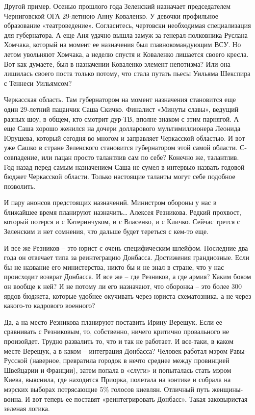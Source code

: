 Другой пример. Осенью прошлого года Зеленский назначает председателем
Черниговской ОГА 29-летнюю Анну Коваленко. У девочки профильное образование
«театроведение». Согласитесь, чертовски необходимая специализация для
губернатора. А еще Аня удачно вышла замуж за генерал-полковника Руслана
Хомчака, который на момент ее назначения был главнокомандующим ВСУ. Но летом
увольняют Хомчака, а неделю спустя и Коваленко лишается своего кресла. Вот как
думаете, был в назначении Коваленко элемент непотизма? Или она лишилась своего
поста только потому, что стала путать пьесы Уильяма Шекспира с Теннеси
Уильямсом?

Черкасская область. Там губернатором на момент назначения становится еще один
29-летний пацанчик Саша Скичко. Финалист «Минуты славы», ведущий разных шоу, в
общем, кто смотрит дур-ТВ, вполне знаком с этим парнягой. А еще Саша хорошо
женился на дочери долларового мультимиллионера Леонида Юрушева, который сегодня
во многом и заправляет Черкасской областью. И вот уже Сашко в стране Зеленского
становится губернатором этой самой области. С-совпадение, или пацан просто
талантлив сам по себе? Конечно же, талантлив. Год назад перед самым назначением
Саша не сумел в интервью назвать годовой бюджет Черкасской области. Только
настоящие таланты могут себе подобное позволить.

И пару анонсов предстоящих назначений. Министром обороны у нас в ближайшее
время планируют назначить… Алексея Резникова. Редкий прохвост, который потерся
и с Катеринчуком, и с Власенко, и с Кличко. Сейчас трется с Зеленским и нет
сомнения, что дальше будет тереться с кем-то еще.

И все же Резников – это юрист с очень специфическим шлейфом. Последние два года
он отвечает типа за реинтеграцию Донбасса. Достижения грандиозные. Если бы не
название его министерства, никто бы и не знал в стране, что у нас происходит
возврат Донбасса. И все же – где Резников, а где армия? Каким боком он вообще к
ней? И не потому ли его назначают, что оборонка – это более 300 ярдов бюджета,
которые удобнее окучивать через юриста-схематозника, а не через какого-то
кадрового военного?

Да, а на место Резникова планируют поставить Ирину Верещук. Если ее сравнивать
с Резниковым, то, собственно, ничего критично провального не произойдет. Трудно
развалить то, что и так не работает. И все-таки, в каком месте Верещук, а в
каком – интеграция Донбасса? Человек работал мэром Равы-Русской (наверное,
превратила городок в нечто среднее между провинцией Швейцарии и Франции), затем
попала в «слуги» и попыталась стать мэром Киева, выяснила, где находится
Приорка, полетала на зонтике и собрала на мэрских выборах потрясающие 5\%
голосов киевлян. Отличный путь женщины-воина. И вот теперь ее поставят
«реинтегрировать Донбасс». Такая заковыристая зеленая логика.

